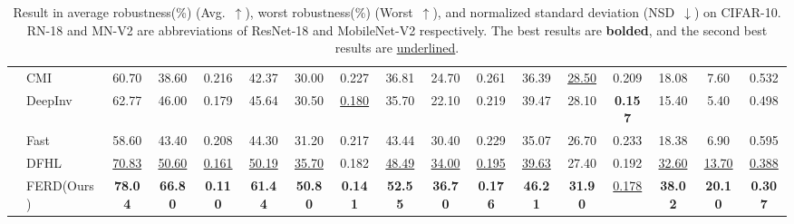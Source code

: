 \begin{table}[t]
{\begin{tabular}{@{}ll ccc ccc ccc ccc ccc!{\vrule width 0pt}@{}}
    & CMI & 60.70 & 38.60 & 0.216 & 42.37 & 30.00 & 0.227 & 36.81 & 24.70 & 0.261 & 36.39 & \underline{28.50} & 0.209 & 18.08 & 7.60 & 0.532 \\
    & DeepInv & 62.77 & 46.00 & 0.179 & 45.64 & 30.50 & \underline{0.180} & 35.70 & 22.10 & 0.219 & 39.47 & 28.10 & \textbf{0.157} & 15.40 & 5.40 & 0.498 \\
    & Fast & 58.60 & 43.40 & 0.208 & 44.30 & 31.20 & 0.217 & 43.44 & 30.40 & 0.229 & 35.07 & 26.70 & 0.233 & 18.38 & 6.90 & 0.595 \\
    & DFHL & \underline{70.83} & \underline{50.60} & \underline{0.161} & \underline{50.19} & \underline{35.70} & 0.182 & \underline{48.49} & \underline{34.00} & \underline{0.195} & \underline{39.63} & 27.40 & 0.192 & \underline{32.60} & \underline{13.70} & \underline{0.388} \\
    & FERD(Ours) & \textbf{78.04} & \textbf{66.80} & \textbf{0.110} & \textbf{61.44} & \textbf{50.80} & \textbf{0.141} & \textbf{52.55} & \textbf{36.70} & \textbf{0.176} & \textbf{46.21} & \textbf{31.90} & \underline{0.178} & \textbf{38.02} & \textbf{20.10} & \textbf{0.307} \\
    \bottomrule
  \end{tabular}%
  }
  \caption{Result in average robustness(\%) (Avg.~$\uparrow$), worst robustness(\%) (Worst~$\uparrow$), and normalized standard deviation (NSD~$\downarrow$) on CIFAR-10. RN-18 and MN-V2 are abbreviations of ResNet-18 and MobileNet-V2 respectively. The best results are \textbf{bolded}, and the second best results are \underline{underlined}.}
  \label{tab1:cifar10_results}
\end{table}
